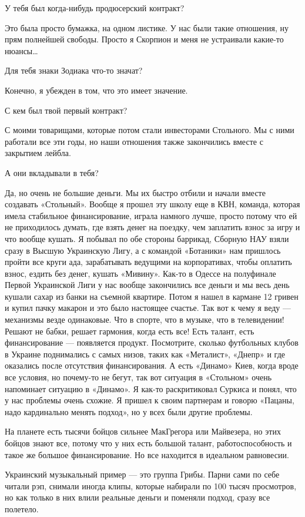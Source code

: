 У тебя был когда-нибудь продюсерский контракт?

Это была просто бумажка, на одном листике. У нас были такие отношения, ну прям
полнейшей свободы. Просто я Скорпион и меня не устраивали какие-то нюансы…

Для тебя знаки Зодиака что-то значат?

Конечно, я убежден в том, что это имеет значение.

С кем был твой первый контракт?

С моими товарищами, которые потом стали инвесторами Стольного. Мы с ними
работали все эти годы, но наши отношения также закончились вместе с закрытием
лейбла.

А они вкладывали в тебя?

Да, но очень не большие деньги. Мы их быстро отбили и начали вместе создавать
«Стольный». Вообще я прошел эту школу еще в КВН, команда, которая имела
стабильное финансирование, играла намного лучше, просто потому что ей не
приходилось думать, где взять денег на поездку, чем заплатить взнос за игру и
что вообще кушать. Я побывал по обе стороны баррикад, Сборную НАУ взяли сразу в
Высшую Украинскую Лигу, а с командой «Ботаники» нам пришлось пройти все круги
ада, зарабатывать ведущими на корпоративах, чтобы оплатить взнос, ездить без
денег, кушать «Мивину». Как-то в Одессе на полуфинале Первой Украинской Лиги у
нас вообще закончились все деньги и мы весь день кушали сахар из банки на
съемной квартире. Потом я нашел в кармане 12 гривен и купил пачку макарон и это
было настоящее счастье.  Так вот к чему я веду --- механизмы везде одинаковые.
Что в спорте, что в музыке, что в телевидении! Решают не бабки, решает
гармония, когда есть все! Есть талант, есть финансирование --- появляется
продукт. Посмотрите, сколько футбольных клубов в Украине поднимались с самых
низов, таких как «Металист», «Днепр» и где оказались после отсутствия
финансирования. А есть «Динамо» Киев, когда вроде все условия, но почему-то не
бегут, так вот ситуация в «Стольном» очень напоминает ситуацию в «Динамо». Я
как-то раскритиковал Суркиса и понял, что у нас проблемы очень схожие. Я пришел
к своим партнерам и говорю «Пацаны, надо кардинально менять подход», но у всех
были другие проблемы.

На планете есть тысячи бойцов сильнее МакГрегора или Майвезера, но этих бойцов
знают все, потому что у них есть большой талант, работоспособность и такое же
большое финансирование. Но все находится в идеальном равновесии.

Украинский музыкальный пример --- это группа Грибы. Парни сами по себе читали
рэп, снимали иногда клипы, которые набирали по 100 тысяч просмотров, но как
только в них влили реальные деньги и поменяли подход, сразу все полетело.


